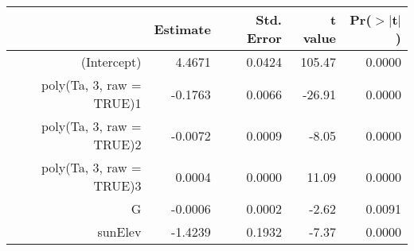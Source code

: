 \begin{tabular}{rrrrr}
  \hline
 & Estimate & Std. Error & t value & Pr($>$$|$t$|$) \\ 
  \hline
(Intercept) & 4.4671 & 0.0424 & 105.47 & 0.0000 \\ 
  poly(Ta, 3, raw = TRUE)1 & -0.1763 & 0.0066 & -26.91 & 0.0000 \\ 
  poly(Ta, 3, raw = TRUE)2 & -0.0072 & 0.0009 & -8.05 & 0.0000 \\ 
  poly(Ta, 3, raw = TRUE)3 & 0.0004 & 0.0000 & 11.09 & 0.0000 \\ 
  G & -0.0006 & 0.0002 & -2.62 & 0.0091 \\ 
  sunElev & -1.4239 & 0.1932 & -7.37 & 0.0000 \\ 
   \hline
\end{tabular}
